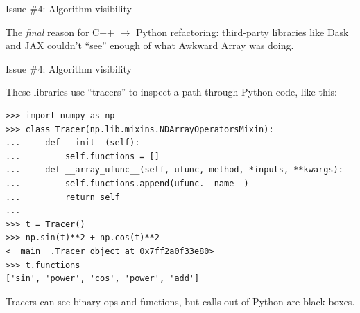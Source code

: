 \documentclass[aspectratio=169]{beamer}
\begin{document}
\begin{frame}{Issue \#4: Algorithm visibility}
\large

\vspace{0.25 cm}
The {\it final} reason for C++ $\to$ Python refactoring: third-party libraries like Dask and JAX couldn't ``see'' enough of what Awkward Array was doing.

\end{frame}

\begin{frame}[fragile]{Issue \#4: Algorithm visibility}
\vspace{0.5 cm}

\large
These libraries use ``tracers'' to inspect a path through Python code, like this:

\small
\begin{verbatim}
>>> import numpy as np
>>> class Tracer(np.lib.mixins.NDArrayOperatorsMixin):
...     def __init__(self):
...         self.functions = []
...     def __array_ufunc__(self, ufunc, method, *inputs, **kwargs):
...         self.functions.append(ufunc.__name__)
...         return self
... 
>>> t = Tracer()
>>> np.sin(t)**2 + np.cos(t)**2
<__main__.Tracer object at 0x7ff2a0f33e80>
>>> t.functions
['sin', 'power', 'cos', 'power', 'add']
\end{verbatim}

\large
\vspace{0.5 cm}
Tracers can see binary ops and functions, but calls out of Python are black boxes.
\end{frame}
\end{document}
